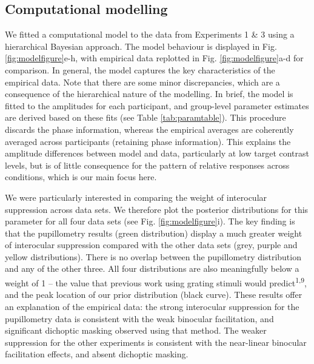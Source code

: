 \documentclass[
]{article}
\begin{document}
\hypertarget{computational-modelling}{%
\subsection{Computational modelling}\label{computational-modelling}}

We fitted a computational model to the data from Experiments 1 \& 3 using a hierarchical Bayesian approach. The model behaviour is displayed in Fig. \ref{fig:modelfigure}e-h, with empirical data replotted in Fig. \ref{fig:modelfigure}a-d for comparison. In general, the model captures the key characteristics of the empirical data. Note that there are some minor discrepancies, which are a consequence of the hierarchical nature of the modelling. In brief, the model is fitted to the amplitudes for each participant, and group-level parameter estimates are derived based on these fits (see Table \ref{tab:paramtable}). This procedure discards the phase information, whereas the empirical averages are coherently averaged across participants (retaining phase information). This explains the amplitude differences between model and data, particularly at low target contrast levels, but is of little consequence for the pattern of relative responses across conditions, which is our main focus here.

We were particularly interested in comparing the weight of interocular suppression across data sets. We therefore plot the posterior distributions for this parameter for all four data sets (see Fig. \ref{fig:modelfigure}i). The key finding is that the pupillometry results (green distribution) display a much greater weight of interocular suppression compared with the other data sets (grey, purple and yellow distributions). There is no overlap between the pupillometry distribution and any of the other three. All four distributions are also meaningfully below a weight of 1 -- the value that previous work using grating stimuli would predict\textsuperscript{1,9}, and the peak location of our prior distribution (black curve). These results offer an explanation of the empirical data: the strong interocular suppression for the pupillometry data is consistent with the weak binocular facilitation, and significant dichoptic masking observed using that method. The weaker suppression for the other experiments is consistent with the near-linear binocular facilitation effects, and absent dichoptic masking.
\end{document}
